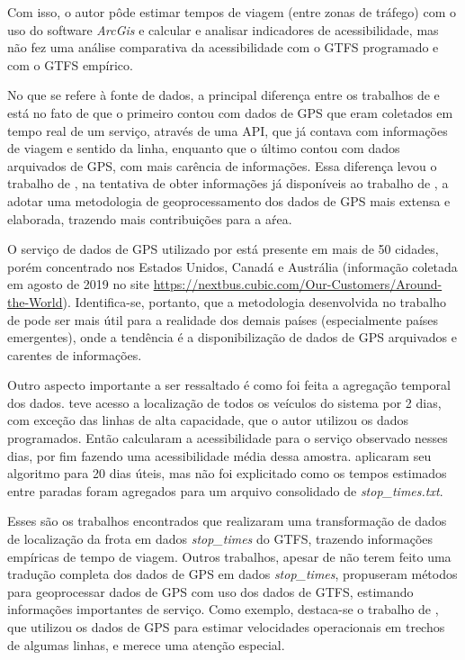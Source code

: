 \documentclass[        
    a4paper,          %
    12pt,             %
    chapter=TITLE,    %
    section=Title,    %
    subsection=Title, %
    oneside,          %
    english,          %
    spanish,          %
    brazil,           %
    fleqn             %
]{abntex2}
\begin{document}
  Com isso, o autor pôde estimar tempos de viagem (entre zonas de tráfego) com o uso do software \emph{ArcGis} e calcular e analisar indicadores de acessibilidade, mas não fez uma análise comparativa da acessibilidade com o GTFS programado e com o GTFS empírico.
  
  No que se refere à fonte de dados, a principal diferença entre os trabalhos de \citet{Wessel2017} e \citet{Arbex2016a} está no fato de que o primeiro contou com dados de GPS que eram coletados em tempo real de um serviço, através de uma API, que já contava com informações de viagem e sentido da linha, enquanto que o último contou com dados arquivados de GPS, com mais carência de informações. Essa diferença levou o trabalho de \citet{Arbex2016a}, na tentativa de obter informações já disponíveis ao trabalho de \citet{Wessel2017}, a adotar uma metodologia de geoprocessamento dos dados de GPS mais extensa e elaborada, trazendo mais contribuições para a aŕea.
  
  O serviço de dados de GPS utilizado por \citet{Wessel2017} está presente em mais de 50 cidades, porém concentrado nos Estados Unidos, Canadá e Austrália (informação coletada em agosto de 2019 no site \url{https://nextbus.cubic.com/Our-Customers/Around-the-World}). Identifica-se, portanto, que a metodologia desenvolvida no trabalho de \citet{Arbex2016a} pode ser mais útil para a realidade dos demais países (especialmente países emergentes), onde a tendência é a disponibilização de dados de GPS arquivados e carentes de informações.
  
  Outro aspecto importante a ser ressaltado é como foi feita a agregação temporal dos dados. \citet{Wessel2017} teve acesso a localização de todos os veículos do sistema por 2 dias, com exceção das linhas de alta capacidade, que o autor utilizou os dados programados. Então calcularam a acessibilidade para o serviço observado nesses dias, por fim fazendo uma acessibilidade média dessa amostra. \citet{Arbex2016a} aplicaram seu algoritmo para 20 dias úteis, mas não foi explicitado como os tempos estimados entre paradas foram agregados para um arquivo consolidado de \emph{stop\_times.txt}.
  
  Esses são os trabalhos encontrados que realizaram uma transformação de dados de localização da frota em dados \emph{stop\_times} do GTFS, trazendo informações empíricas de tempo de viagem. Outros trabalhos, apesar de não terem feito uma tradução completa dos dados de GPS em dados \emph{stop\_times}, propuseram métodos para geoprocessar dados de GPS com uso dos dados de GTFS, estimando informações importantes de serviço. Como exemplo, destaca-se o trabalho de \citet{Rabay2017}, que utilizou os dados de GPS para estimar velocidades operacionais em trechos de algumas linhas, e merece uma atenção especial.
  
\end{document}
